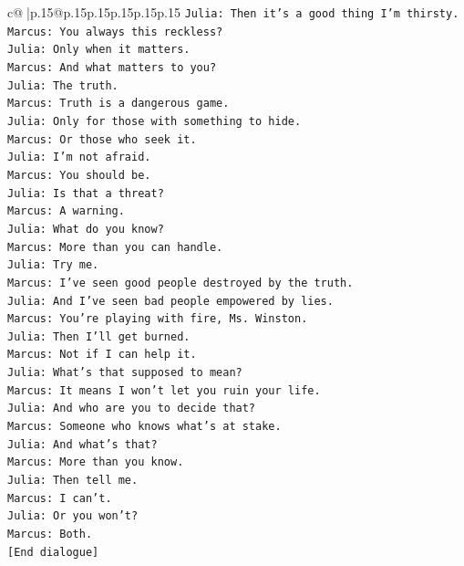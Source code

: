 \documentclass{article}
\begin{document}
{\begin{supertabular}{c@{$\;$}|p{.15\linewidth}@{}p{.15\linewidth}p{.15\linewidth}p{.15\linewidth}p{.15\linewidth}p{.15\linewidth}}
{{{\texttt{Julia: Then it's a good thing I'm thirsty.} \\
\texttt{Marcus: You always this reckless?} \\
\texttt{Julia: Only when it matters.} \\
\texttt{Marcus: And what matters to you?} \\
\texttt{Julia: The truth.} \\
\texttt{Marcus: Truth is a dangerous game.} \\
\texttt{Julia: Only for those with something to hide.} \\
\texttt{Marcus: Or those who seek it.} \\
\texttt{Julia: I'm not afraid.} \\
\texttt{Marcus: You should be.} \\
\texttt{Julia: Is that a threat?} \\
\texttt{Marcus: A warning.} \\
\texttt{Julia: What do you know?} \\
\texttt{Marcus: More than you can handle.} \\
\texttt{Julia: Try me.} \\
\texttt{Marcus: I've seen good people destroyed by the truth.} \\
\texttt{Julia: And I've seen bad people empowered by lies.} \\
\texttt{Marcus: You're playing with fire, Ms. Winston.} \\
\texttt{Julia: Then I'll get burned.} \\
\texttt{Marcus: Not if I can help it.} \\
\texttt{Julia: What's that supposed to mean?} \\
\texttt{Marcus: It means I won't let you ruin your life.} \\
\texttt{Julia: And who are you to decide that?} \\
\texttt{Marcus: Someone who knows what's at stake.} \\
\texttt{Julia: And what's that?} \\
\texttt{Marcus: More than you know.} \\
\texttt{Julia: Then tell me.} \\
\texttt{Marcus: I can't.} \\
\texttt{Julia: Or you won't?} \\
\texttt{Marcus: Both.} \\
\texttt{{[}End dialogue{]}} \\
\\ 
}}}
\end{supertabular}}
\end{document}
